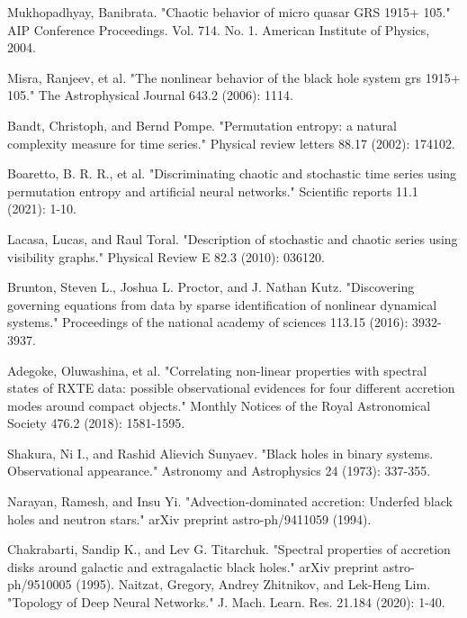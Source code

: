 \documentclass[10pt,conference]{IEEEtran}
\begin{document}
\begin{thebibliography}{1}
 Mukhopadhyay, Banibrata. "Chaotic behavior of micro quasar GRS 1915+ 105." AIP Conference Proceedings. Vol. 714. No. 1. American Institute of Physics, 2004.

Misra, Ranjeev, et al. "The nonlinear behavior of the black hole system grs 1915+ 105." The Astrophysical Journal 643.2 (2006): 1114.

Bandt, Christoph, and Bernd Pompe. "Permutation entropy: a natural complexity measure for time series." Physical review letters 88.17 (2002): 174102.

Boaretto, B. R. R., et al. "Discriminating chaotic and stochastic time series using permutation entropy and artificial neural networks." Scientific reports 11.1 (2021): 1-10.

  Lacasa, Lucas, and Raul Toral. "Description of stochastic and chaotic series using visibility graphs." Physical Review E 82.3 (2010): 036120.

  Brunton, Steven L., Joshua L. Proctor, and J. Nathan Kutz. "Discovering governing equations from data by sparse identification of nonlinear dynamical systems." Proceedings of the national academy of sciences 113.15 (2016): 3932-3937.

Adegoke, Oluwashina, et al. "Correlating non-linear properties with spectral states of RXTE data: possible observational evidences for four different accretion modes around compact objects." Monthly Notices of the Royal Astronomical Society 476.2 (2018): 1581-1595.

Shakura, Ni I., and Rashid Alievich Sunyaev. "Black holes in binary systems. Observational appearance." Astronomy and Astrophysics 24 (1973): 337-355.

  Narayan, Ramesh, and Insu Yi. "Advection-dominated accretion: Underfed black holes and neutron stars." arXiv preprint astro-ph/9411059 (1994).

Chakrabarti, Sandip K., and Lev G. Titarchuk. "Spectral properties of accretion disks around galactic and extragalactic black holes." arXiv preprint astro-ph/9510005 (1995).
Naitzat, Gregory, Andrey Zhitnikov, and Lek-Heng Lim. "Topology of Deep Neural Networks." J. Mach. Learn. Res. 21.184 (2020): 1-40.


\end{thebibliography}

\end{document}

